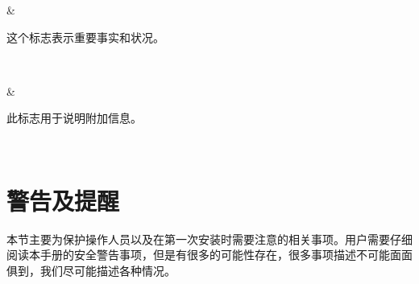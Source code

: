 \documentclass[a4paper,11pt,english,openany,oneside]{sphinxmanual}
\begin{document}
\begin{savenotes}
\begin{tabular}[t]{}
\begin{varwidth}[t]{}
\sphinxbeforeendvarwidth
\end{varwidth}%
&\begin{varwidth}[t]{}
\sphinxAtStartPar
这个标志表示重要事实和状况。
\sphinxbeforeendvarwidth
\end{varwidth}%
\\
\sphinxhline\begin{varwidth}[t]{}
\sphinxAtStartPar
{}
\sphinxbeforeendvarwidth
\end{varwidth}%
&\begin{varwidth}[t]{}
\sphinxAtStartPar
此标志用于说明附加信息。
\sphinxbeforeendvarwidth
\end{varwidth}%
\\
\sphinxbottomrule
\end{tabular}
\sphinxtableafterendhook\par
\sphinxattableend\end{savenotes}


\section{警告及提醒}
\label{\detokenize{05 _u5b89_u5168_u89c4_u8303:id5}}
\sphinxAtStartPar
本节主要为保护操作人员以及在第一次安装时需要注意的相关事项。用户需要仔细阅读本手册的安全警告事项，但是有很多的可能性存在，很多事项描述不可能面面俱到，我们尽可能描述各种情况。
\end{document}
